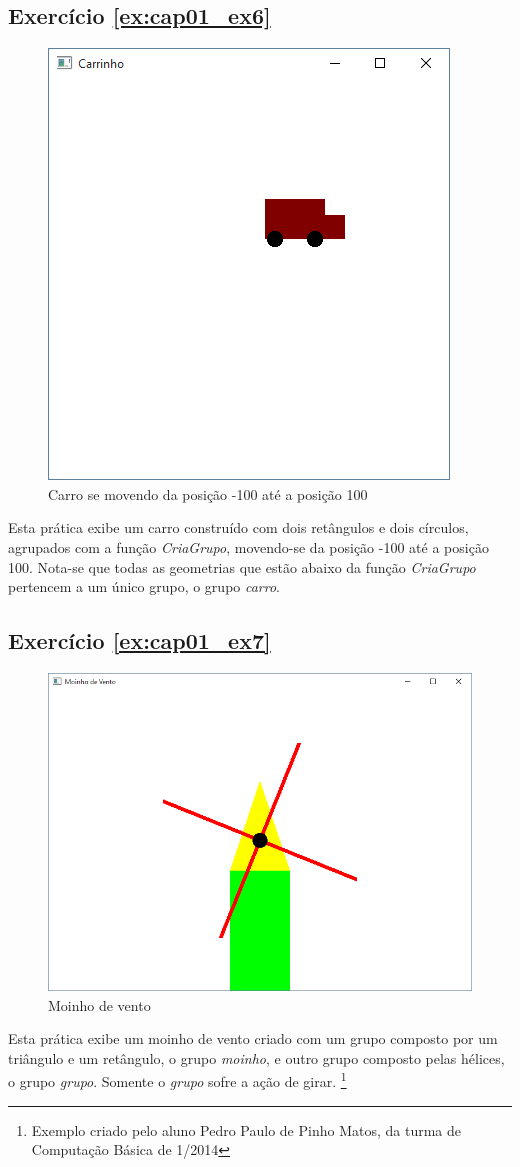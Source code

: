 \subsection*{Exercício \ref{ex:cap01_ex6}}
\begin{figure}[ht]
  \centerline{\includegraphics[width=.5\textwidth]{img/cap1_ex5.png}}
  \caption{Carro se movendo da posição -100 até a posição 100}
  \label{fig:cap01_ex6}
\end{figure}
Esta prática exibe um carro construído com dois retângulos e dois círculos, agrupados com a função \emph{CriaGrupo}, movendo-se da posição -100 até a posição 100. Nota-se que todas as geometrias que estão abaixo da função \emph{CriaGrupo} pertencem a um único grupo, o grupo \emph{carro}.


\subsection*{Exercício \ref{ex:cap01_ex7}}
\begin{figure}[ht]
  \centerline{\includegraphics[width=.5\textwidth]{img/cap1_ex7.png}}
  \caption{Moinho de vento}
  \label{fig:cap01_ex7}
\end{figure}
Esta prática exibe um moinho de vento criado com um grupo composto por um triângulo e um retângulo, o grupo \emph{moinho}, e outro grupo composto pelas hélices, o grupo \emph{grupo}. Somente o \emph{grupo} sofre a ação de girar. \footnote{Exemplo criado pelo aluno Pedro Paulo de Pinho Matos, da turma de Computação Básica de 1/2014}

